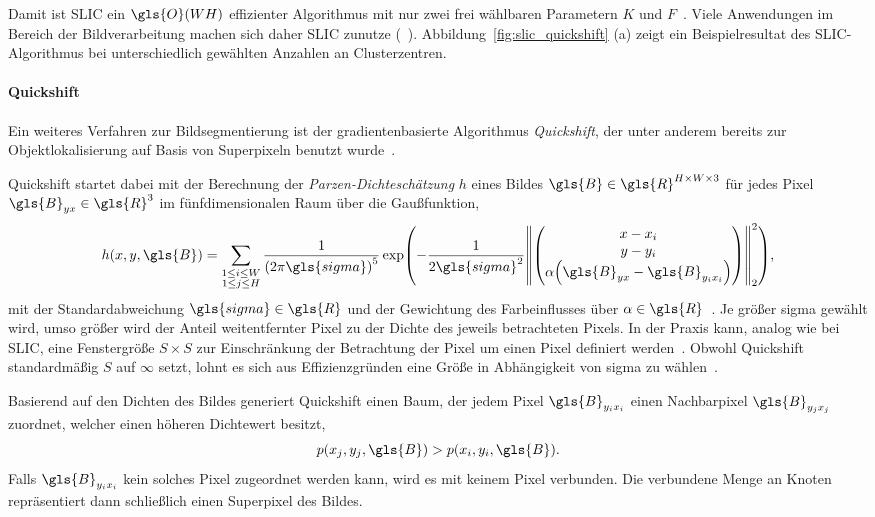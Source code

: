 Damit ist \gls{SLIC} ein $\gls{O}\left(WH\right)$ effizienter Algorithmus mit nur zwei frei wählbaren Parametern $K$ und $F$~\cite{slic}.
Viele Anwendungen im Bereich der Bildverarbeitung machen sich daher \gls{SLIC} zunutze (\vgl{}~\cite{Gadde, supercnn, super}).
Abbildung~\ref{fig:slic_quickshift} (a) zeigt ein Beispielresultat des \gls{SLIC}-Algorithmus bei unterschiedlich gewählten Anzahlen an Clusterzentren.



\paragraph{Quickshift}
\label{quickshift}

Ein weiteres Verfahren zur Bildsegmentierung ist der gradientenbasierte Algorithmus \emph{Quickshift}, der unter anderem bereits zur Objektlokalisierung auf Basis von Superpixeln benutzt wurde~\cite{quickshift,Fulkerson}.

Quickshift startet dabei mit der Berechnung der \emph{Parzen-Dichteschätzung} $h$ eines Bildes $\gls{B} \in \gls{R}^{H \times W \times 3}$ für jedes Pixel $\gls{B}_{yx} \in \gls{R}^3$ im fünfdimensionalen Raum über die Gaußfunktion, \dhe{}
\begin{equation*}
  h\left(x,y, \gls{B}\right) = \sum_{\substack{1 \leq i \leq W\\1 \leq j \leq H}}
  \frac{1}{{\left(2\pi\gls{sigma}\right)}^5} \exp\left(-\frac{1}{2\gls{sigma}^2}{\left\|\begin{pmatrix}
    x - x_i\\
    y - y_i\\
    \alpha \left(\gls{B}_{yx} - \gls{B}_{y_i x_i}\right)
  \end{pmatrix}\right\|}_2^2\right),
\end{equation*}
mit der Standardabweichung $\gls{sigma} \in \gls{R}$ und der Gewichtung des Farbeinflusses über $\alpha \in \gls{R}$~\cite{quickshift}.
Je größer \gls{sigma} gewählt wird, umso größer wird der Anteil weitentfernter Pixel zu der Dichte des jeweils betrachteten Pixels.
In der Praxis kann, analog wie bei \gls{SLIC}, eine Fenstergröße $S \times S$ zur Einschränkung der Betrachtung der Pixel um einen Pixel definiert werden~\cite{super}.
Obwohl Quickshift standardmäßig $S$ auf $\infty$ setzt, lohnt es sich aus Effizienzgründen eine Größe in Abhängigkeit von \gls{sigma} zu wählen~\cite{quickshift}.

Basierend auf den Dichten des Bildes generiert Quickshift einen Baum, der jedem Pixel $\gls{B}_{y_i x_i}$ einen Nachbarpixel $\gls{B}_{y_j x_j}$ zuordnet, welcher einen höheren Dichtewert besitzt, \dhe{}
\begin{equation*}
  p\left(x_j, y_j, \gls{B}\right) > p\left(x_i, y_i, \gls{B}\right).
\end{equation*}
Falls $\gls{B}_{y_i x_i}$ kein solches Pixel zugeordnet werden kann, wird es mit keinem Pixel verbunden.
Die verbundene Menge an Knoten repräsentiert dann schließlich einen Superpixel des Bildes.

